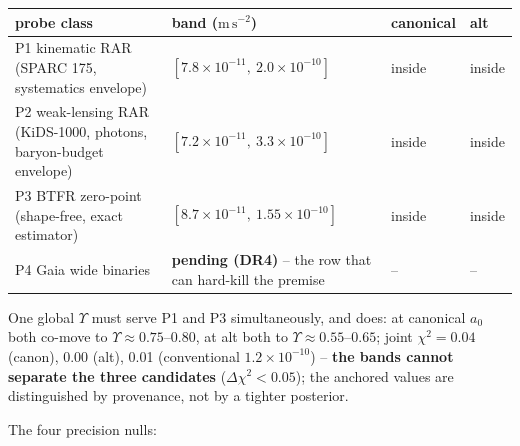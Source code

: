 \documentclass[
]{article}
\newcounter{none} %
\begin{document}
{\def\LTcaptype{none} %
\begin{longtable}[]{@{}
  >{\raggedright\arraybackslash}p{}
  >{\raggedright\arraybackslash}p{}
  >{\raggedright\arraybackslash}p{}
  >{\raggedright\arraybackslash}p{}@{}}
\toprule\noalign{}
\begin{minipage}[b]{\linewidth}\raggedright
probe class
\end{minipage} & \begin{minipage}[b]{\linewidth}\raggedright
band (\(\mathrm{m\,s^{-2}}\))
\end{minipage} & \begin{minipage}[b]{\linewidth}\raggedright
canonical
\end{minipage} & \begin{minipage}[b]{\linewidth}\raggedright
alt
\end{minipage} \\
\midrule\noalign{}
\endhead
\bottomrule\noalign{}
\endlastfoot
P1 kinematic RAR (SPARC 175, systematics envelope) &
\([7.8 \times 10^{-11},\ 2.0 \times 10^{-10}]\) & inside & inside \\
P2 weak-lensing RAR (KiDS-1000, photons, baryon-budget envelope) &
\([7.2 \times 10^{-11},\ 3.3 \times 10^{-10}]\) & inside & inside \\
P3 BTFR zero-point (shape-free, exact estimator) &
\([8.7 \times 10^{-11},\ 1.55 \times 10^{-10}]\) & inside & inside \\
P4 Gaia wide binaries & \textbf{pending (DR4)} -- the row that can
hard-kill the premise & -- & -- \\
\end{longtable}
}

One global \(\Upsilon\) must serve P1 and P3 simultaneously, and does:
at canonical \(a_0\) both co-move to
\(\Upsilon \approx 0.75\)--\(0.80\), at alt both to
\(\Upsilon \approx 0.55\)--\(0.65\); joint \(\chi^2 = 0.04\) (canon),
0.00 (alt), 0.01 (conventional \(1.2 \times 10^{-10}\)) -- \textbf{the
bands cannot separate the three candidates} (\(\Delta\chi^2 < 0.05\));
the anchored values are distinguished by provenance, not by a tighter
posterior.

The four precision nulls:
\end{document}

